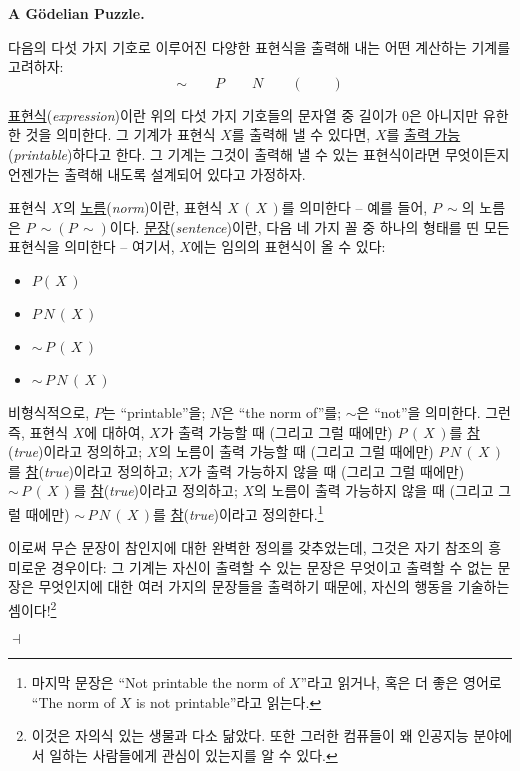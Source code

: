 \documentclass[12pt]{paper}
\newenvironment{context}[1][]
{ \noindent \textbf{{#1}.}
}
{ \hfill $ \dashv $ }
\begin{document}
\begin{context}[A G\"odelian Puzzle]
다음의 다섯 가지 기호로 이루어진 다양한 표현식을 출력해 내는 어떤 계산하는 기계를 고려하자:
$$ \sim \qquad P \qquad N \qquad \left( \right. \qquad \left. \right) $$

\underline{표현식}(\textit{expression})이란 위의 다섯 가지 기호들의 문자열 중 길이가 $0$은 아니지만 유한한 것을 의미한다.
그 기계가 표현식 $X$를 출력해 낼 수 있다면,
$X$를 \underline{출력 가능}(\textit{printable})하다고 한다.
그 기계는 그것이 출력해 낼 수 있는 표현식이라면 무엇이든지 언젠가는 출력해 내도록 설계되어 있다고 가정하자.

표현식 $X$의 \underline{노름}(\textit{norm})이란,
표현식 $X \, \left( \, X \, \right)$를 의미한다 --
예를 들어, $P \, \sim$의 노름은 $P \, \sim \left( P \, \sim \right)$이다.
\underline{문장}(\textit{sentence})이란, 다음 네 가지 꼴 중 하나의 형태를 띤 모든 표현식을 의미한다 --
여기서, $X$에는 임의의 표현식이 올 수 있다:
\begin{itemize}
\item[(1)] $P \left( \, X \, \right)$
\item[(2)] $P \, N \, \left( \, X \, \right)$
\item[(3)] $\sim \, P \, \left( \, X \, \right)$
\item[(4)] $\sim \, P \, N \, \left( \, X \, \right)$   
\end{itemize}

비형식적으로, $P$는 ``printable''을; $N$은 ``the norm of''를; $\sim$은 ``not''을 의미한다.
그런즉, 표현식 $X$에 대하여,
$X$가 출력 가능할 때 (그리고 그럴 때에만) $P \, \left( \, X \, \right)$를 \underline{참}(\textit{true})이라고 정의하고;
$X$의 노름이 출력 가능할 때 (그리고 그럴 때에만) $P \, N \, \left( \, X \, \right)$를 \underline{참}(\textit{true})이라고 정의하고;
$X$가 출력 가능하지 않을 때 (그리고 그럴 때에만) $\sim \, P \, \left( \, X \, \right)$를 \underline{참}(\textit{true})이라고 정의하고;
$X$의 노름이 출력 가능하지 않을 때 (그리고 그럴 때에만) $\sim \, P \, N \, \left( \, X \, \right)$를 \underline{참}(\textit{true})이라고 정의한다.\footnote
{
마지막 문장은 ``Not printable the norm of $X$''라고 읽거나,
혹은 더 좋은 영어로 ``The norm of $X$ is not printable''라고 읽는다.
}

이로써 무슨 문장이 참인지에 대한 완벽한 정의를 갖추었는데,
그것은 자기 참조의 흥미로운 경우이다:
그 기계는 자신이 출력할 수 있는 문장은 무엇이고 출력할 수 없는 문장은 무엇인지에 대한 여러 가지의 문장들을 출력하기 때문에,
자신의 행동을 기술하는 셈이다!\footnote
{
이것은 자의식 있는 생물과 다소 닮았다.
또한 그러한 컴퓨들이 왜 인공지능 분야에서 일하는 사람들에게 관심이 있는지를 알 수 있다.
}


\end{context}
\end{document}
